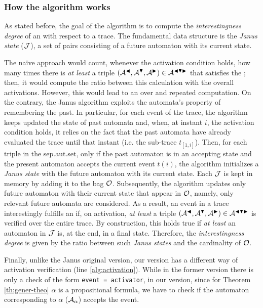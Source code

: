 \subsubsection*{How the algorithm works}
As stated before, the goal of the algorithm is to compute the \textit{interestingness degree} of an \rcon\xspace with respect to a trace. The fundamental data structure is the \textit{Janus state} ($\mathcal{J}$), a set of pairs consisting of a future automaton with its current state. 

The na\"ive approach would count, whenever the activation condition holds, how many times there is  \textit{at least} a triple $(\mathcal{A}^{\blacktriangleleft}, \mathcal{A}^{\blacktriangledown}, \mathcal{A}^{\blacktriangleright}) \in \mathcal{A}^{\blacktriangleleft \blacktriangledown \blacktriangleright}$ that satisfies the \rcon\xspace; then, it would compute the ratio between this calculation with the overall activations. However, this would lead to an over and repeated computation. On the contrary, the Janus algorithm exploits the automata's property of remembering the past. In particular, for each event of the trace, the algorithm keeps updated the state of past automata and, when, at instant $i$, the activation condition holds, it relies on the fact that the past automata have already evaluated the trace until that instant (i.e. the sub-trace $t_{[1,i]}$). Then, for each triple in the sep.aut.set, only if the past automaton is in an accepting state and the present automaton accepts the current event $t(i)$, the algorithm initializes a \textit{Janus state} with the future automaton with its current state. Each $\mathcal{J}$ is kept in memory by adding it to the bag $\mathcal{O}$. Subsequently, the algorithm updates only future automaton with their current state that appear in $\mathcal{O}$, namely, only relevant future automata are considered. As a result, an event in a trace interestingly fulfills an \rcon\xspace if, on activation, \textit{at least} a triple $(\mathcal{A}^{\blacktriangleleft}, \mathcal{A}^{\blacktriangledown}, \mathcal{A}^{\blacktriangleright}) \in \mathcal{A}^{\blacktriangleleft \blacktriangledown \blacktriangleright}$ is verified over the entire trace. By construction, this holds true if \textit{at least} an automaton in $\mathcal{J}$ is, at the end, in a final state. Therefore, the \textit{interestingness degree} is given by the ratio between such \textit{Janus states} and the cardinality of $\mathcal{O}$.

Finally, unlike the Janus original version, our version has a different way of activation verification (line \ref{alg:activation}). While in the former version there is only a check of the form \texttt{event = activator}, in our version, since for Theorem \ref{th:gener-theo} $\alpha$ is a propositional formula, we have to check if the automaton corresponding to $\alpha$ ($\mathcal{A}_{\alpha}$) accepts the event.

